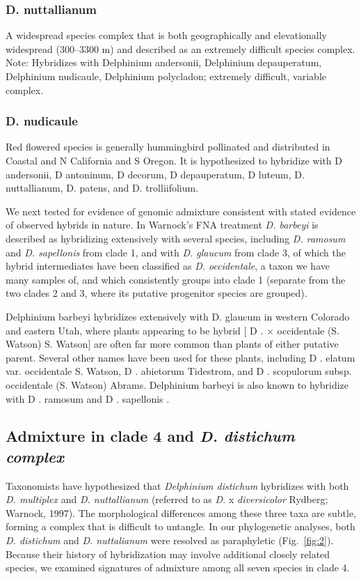 \documentclass[11pt]{article}
\begin{document}
\subsubsection{D. nuttallianum}
A widespread species complex that is both geographically and elevationally widespread (300--3300 m) and 
described as an extremely difficult species complex. 
Note: Hybridizes with Delphinium andersonii, Delphinium depauperatum, Delphinium nudicaule, Delphinium polycladon; extremely difficult, variable complex.


\subsubsection{D. nudicaule}
Red flowered species is generally hummingbird pollinated and distributed in Coastal and N California and S Oregon. It is hypothesized to hybridize with D andersonii, D antoninum, D decorum, D depauperatum, D luteum, D. nuttallianum, D. patens, and D. trolliifolium. 


We next tested for evidence of genomic admixture consistent with stated evidence
of observed hybrids in nature. In Warnock's FNA treatment \emph{D. barbeyi} is 
described as hybridizing extensively with several species, including 
\emph{D. ramosum} and \emph{D. sapellonis} from clade 1, and with 
\emph{D. glaucum} from clade 3, of which the hybrid intermediates have been 
classified as \emph{D. occidentale}, a taxon we have many samples of, and
which consistently groups into clade 1 (separate from the two clades 2 and 3, 
where its putative progenitor species are grouped). 


Delphinium barbeyi hybridizes extensively with D. glaucum in western Colorado and eastern Utah, where plants appearing to be hybrid [ D . × occidentale (S. Watson) S. Watson] are often far more common than plants of either putative parent. Several other names have been used for these plants, including D . elatum var. occidentale S. Watson, D . abietorum Tidestrom, and D . scopulorum subsp. occidentale (S. Watson) Abrams. Delphinium barbeyi is also known to hybridize with D . ramosum and D . sapellonis .


\subsection{Admixture in clade 4 and \emph{D. distichum complex}}
Taxonomists have hypothesized that \emph{Delphinium distichum} hybridizes with both 
\emph{D. multiplex} and \emph{D. nuttallianum} 
(referred to as \emph{D.} x \emph{diversicolor} Rydberg; Warnock, 1997).
% 
The morphological differences among these three taxa are subtle, forming a complex that 
is difficult to untangle. 
% 
In our phylogenetic analyses, both \emph{D. distichum} and \emph{D. nuttalianum} were
resolved as paraphyletic (Fig.~\ref{fig:2}). Because their history of hybridization
may involve additional closely related species, we examined signatures of admixture
among all seven species in clade 4. 
% 
\end{document}
